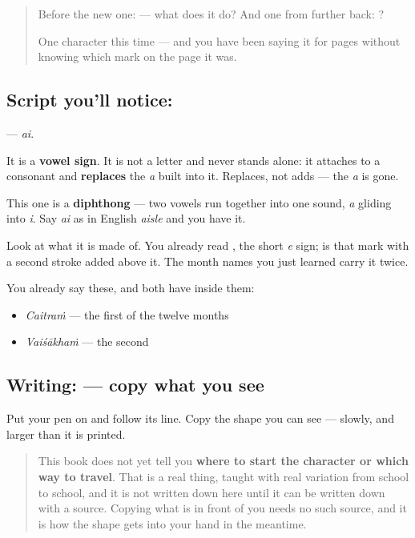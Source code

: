 \begin{quote}
Before the new one:  — what does it do? And one from further back: ?

One character this time — and you have been saying it for pages without knowing which mark on the page it was.
\end{quote}

\subsection*{Script you'll notice: }
\textbf{} — \emph{ai}.

It is a \textbf{vowel sign}. It is not a letter and never stands alone: it attaches to a consonant and \textbf{replaces} the \emph{a} built into it. Replaces, not adds — the \emph{a} is gone.

This one is a \textbf{diphthong} — two vowels run together into one sound, \emph{a} gliding into \emph{i}. Say \emph{ai} as in English \emph{aisle} and you have it.

Look at what it is made of. You already read \textbf{}, the short \emph{e} sign; \textbf{} is that mark with a second stroke added above it. The month names you just learned carry it twice.

You already say these, and both have  inside them:

\begin{itemize}
\raggedright
  \item \textbf{} \emph{Caitraṁ} — the first of the twelve months
  \item \textbf{} \emph{Vaiśākhaṁ} — the second
\end{itemize}

\subsection*{Writing:  — copy what you see}
Put your pen on  and follow its line. Copy the shape you can see — slowly, and larger than it is printed.

\begin{quote}
This book does not yet tell you \textbf{where to start the character or which way to travel}. That is a real thing, taught with real variation from school to school, and it is not written down here until it can be written down with a source. Copying what is in front of you needs no such source, and it is how the shape gets into your hand in the meantime.
\end{quote}

